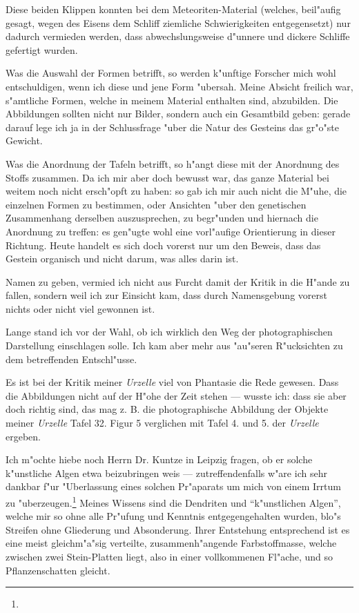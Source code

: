 \documentclass[a4paper, 11pt, oneside]{article}
\begin{document}
Diese beiden Klippen konnten bei dem Meteoriten-Material (welches, beil"aufig gesagt, wegen des Eisens dem Schliff ziemliche Schwierigkeiten entgegensetzt) nur dadurch vermieden werden, dass abwechslungsweise d"unnere und dickere Schliffe gefertigt wurden.

Was die Auswahl der Formen betrifft, so werden k"unftige Forscher mich wohl entschuldigen, wenn ich diese und jene Form "ubersah. Meine Absicht freilich war, s"amtliche Formen, welche in meinem Material enthalten sind, abzubilden. Die Abbildungen sollten nicht nur Bilder, sondern auch ein Gesamtbild geben: gerade darauf lege ich ja in der Schlussfrage "uber die Natur des Gesteins das gr"o"ste Gewicht.

Was die Anordnung der Tafeln betrifft, so h"angt diese mit der Anordnung des Stoffs zusammen. Da ich mir aber doch bewusst war, das ganze Material bei weitem noch nicht ersch"opft zu haben: so gab ich mir auch nicht die M"uhe, die einzelnen Formen zu bestimmen, oder Ansichten "uber den genetischen Zusammenhang derselben auszusprechen, zu begr"unden und hiernach die Anordnung zu treffen: es gen"ugte wohl eine vorl"aufige Orientierung in dieser Richtung. Heute handelt es sich doch vorerst nur um den Beweis, dass das Gestein organisch und nicht darum, was alles darin ist.

Namen zu geben, vermied ich nicht aus Furcht damit der Kritik in die H"ande zu fallen, sondern weil ich zur Einsicht kam, dass durch Namensgebung vorerst nichts oder nicht viel gewonnen ist.

Lange stand ich vor der Wahl, ob ich wirklich den Weg der photographischen Darstellung einschlagen solle. Ich kam aber mehr aus "au"seren R"ucksichten zu dem betreffenden Entschl"usse.

Es ist bei der Kritik meiner \emph{Urzelle} viel von Phantasie die Rede gewesen. Dass die Abbildungen nicht auf der H"ohe der Zeit stehen --- wusste ich: dass sie aber doch richtig sind, das mag z. B. die photographische Abbildung der Objekte meiner \emph{Urzelle} Tafel 32. Figur 5 verglichen mit Tafel 4. und 5. der \emph{Urzelle} ergeben.

Ich m"ochte hiebe noch Herrn Dr. Kuntze in Leipzig fragen, ob er solche k"unstliche Algen etwa beizubringen weis --- zutreffendenfalls w"are ich sehr dankbar f"ur "Uberlassung eines solchen Pr"aparats um mich von einem Irrtum zu "uberzeugen.\footnote{} Meines Wissens sind die Dendriten und "`k"unstlichen Algen"', welche mir so ohne alle Pr"ufung und Kenntnis entgegengehalten wurden, blo"s Streifen ohne Gliederung und Absonderung. Ihrer Entstehung entsprechend ist es eine meist gleichm"a"sig verteilte, zusammenh"angende Farbstoffmasse, welche zwischen zwei Stein-Platten liegt, also in einer vollkommenen Fl"ache, und so Pflanzenschatten gleicht.
\end{document}

